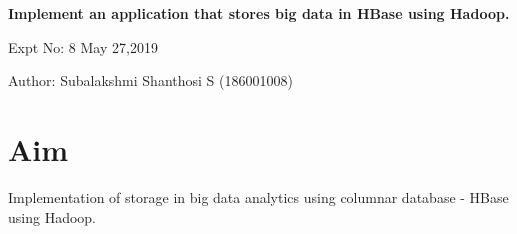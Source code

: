 \documentclass[a4paper,10pt]{article}
\begin{document}
\setcounter{secnumdepth}{-1} 

\begin{center}
\textbf{\LARGE Implement an application that stores big data in HBase using Hadoop.}
\end{center}

\raggedright Expt No: 8 \hfill \raggedleft May 27,2019 \\ 

\raggedright Author: Subalakshmi Shanthosi S (186001008) \par 


\section{Aim}
Implementation of storage in big data analytics using columnar database - HBase using Hadoop.
\end{document}

